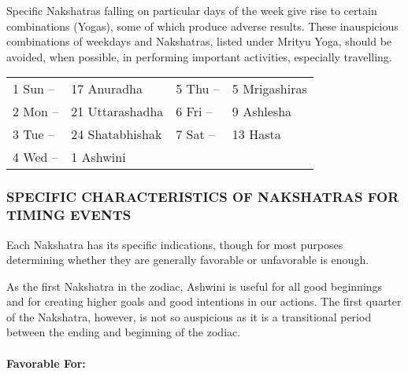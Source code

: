Specific Nakshatras falling on particular days of the week give rise to certain combinations (Yogas), some of which produce adverse results.  These inauspicious combinations of weekdays and Nakshatras, listed under Mrityu Yoga, should be avoided, when possible, in performing important activities, especially travelling.

               


\begin{center}
\begin{tabular}{ l l l l}  
1 Sun     –        &17 Anuradha               &5 Thu   –          & 5 Mrigashiras                              \\

2 Mon    –        &21 Uttarashadha         &6 Fri     –           &9 Ashlesha                              \\

3 Tue     –        &24 Shatabhishak         &7 Sat    –         &13 Hasta                              \\

4 Wed    –          &1 Ashwini  &&                              \\
   \end{tabular}
\end{center}
 

 

\subsubsection{SPECIFIC CHARACTERISTICS OF NAKSHATRAS FOR TIMING EVENTS}


 

Each Nakshatra has its specific indications, though for most purposes determining whether they are generally favorable or unfavorable is enough.

 


As the first Nakshatra in the zodiac, Ashwini is useful for all good beginnings and for creating higher goals and good intentions in our actions. The first quarter of the Nakshatra, however, is not so auspicious as it is a transitional period between the ending and beginning of the zodiac.

 

\paragraph{Favorable For:}

